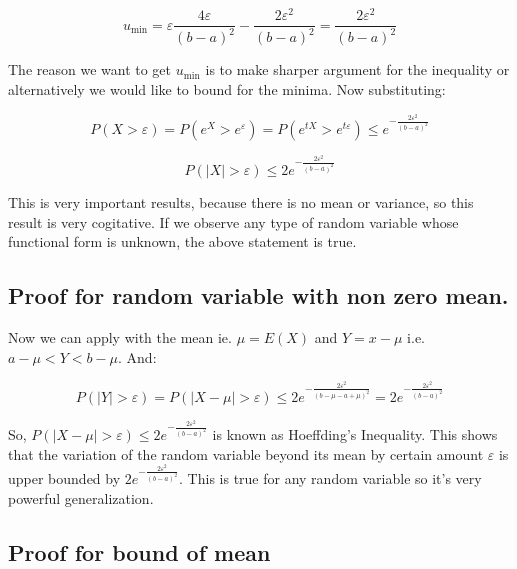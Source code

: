 \documentclass[
]{article}
\begin{document}
\[{{u}_{\min }}=\varepsilon \frac{4\varepsilon }{{{\left( b-a \right)}^{2}}}-\frac{2{{\varepsilon }^{2}}}{{{\left( b-a \right)}^{2}}}=\frac{2{{\varepsilon }^{2}}}{{{\left( b-a \right)}^{2}}}\]

The reason we want to get \({{u}_{\min }}\) is to make sharper argument
for the inequality or alternatively we would like to bound for the
minima. Now substituting:

\[P\left( X>\varepsilon  \right)=P\left( {{e}^{X}}>{{e}^{\varepsilon }} \right)=P\left( {{e}^{tX}}>{{e}^{t\varepsilon }} \right)\le {{e}^{-\frac{2{{\varepsilon }^{2}}}{{{\left( b-a \right)}^{2}}}}}\]

\[P\left( \left| X \right|>\varepsilon  \right)\le 2{{e}^{-\frac{2{{\varepsilon }^{2}}}{{{\left( b-a \right)}^{2}}}}}\]

This is very important results, because there is no mean or variance, so
this result is very cogitative. If we observe any type of random
variable whose functional form is unknown, the above statement is true.

\hypertarget{proof-for-random-variable-with-non-zero-mean.}{%
\subsection{Proof for random variable with non zero
mean.}\label{proof-for-random-variable-with-non-zero-mean.}}

Now we can apply with the mean ie. \(\mu =E\left( X \right)\) and
\(Y=x-\mu\) i.e.~\(a-\mu <Y<b-\mu\). And:

\[P\left( \left| Y \right|>\varepsilon  \right)=P\left( \left| X-\mu  \right|>\varepsilon  \right)\le 2{{e}^{-\frac{2{{\varepsilon }^{2}}}{{{\left( b-\mu -a+\mu  \right)}^{2}}}}}=2{{e}^{-\frac{2{{\varepsilon }^{2}}}{{{\left( b-a \right)}^{2}}}}}\]

So,
\(P\left( \left| X-\mu \right|>\varepsilon \right)\le 2{{e}^{-\frac{2{{\varepsilon }^{2}}}{{{\left( b-a \right)}^{2}}}}}\)
is known as Hoeffding's Inequality. This shows that the variation of the
random variable beyond its mean by certain amount \(\varepsilon\) is
upper bounded by
\(2{{e}^{-\frac{2{{\varepsilon }^{2}}}{{{\left( b-a \right)}^{2}}}}}\).
This is true for any random variable so it's very powerful
generalization.

\hypertarget{proof-for-bound-of-mean}{%
\subsection{Proof for bound of mean}\label{proof-for-bound-of-mean}}
\end{document}
